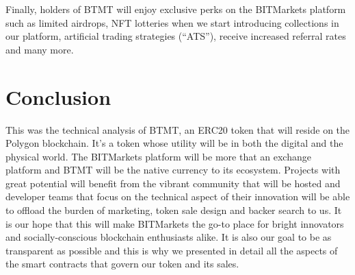 \documentclass[a4paper,12pt]{article}
\begin{document}
Finally, holders of BTMT will enjoy exclusive perks on the BITMarkets platform such as limited airdrops, NFT lotteries when we start introducing
collections in our platform, artificial trading strategies (``ATS''), receive increased referral rates and many more.

\section{Conclusion}

This was the technical analysis of BTMT, an ERC20 token that will reside on the Polygon
blockchain. It's a token whose utility will be in both the digital and
the physical world. The BITMarkets platform will be more that an exchange platform and
BTMT will be the native currency to its ecosystem. Projects with great potential will
benefit from the vibrant community that will be hosted and developer teams that
focus on the technical aspect of their innovation will be able to offload the burden of
marketing, token sale design and backer search to us.
It is our hope that this will make BITMarkets the go-to place for bright innovators and
socially-conscious blockchain enthusiasts alike. It is also our goal to be as transparent as possible
and this is why we presented in detail all the aspects of the smart contracts that govern our token and its sales.
\end{document}

